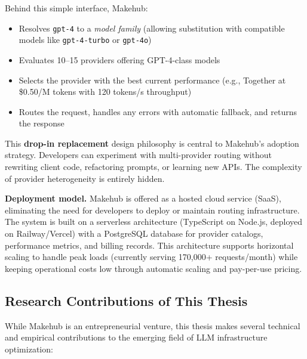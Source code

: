 \documentclass[english]{article}
\begin{document}
Behind this simple interface, Makehub:
\begin{itemize}
\item Resolves \texttt{gpt-4} to a \emph{model family} (allowing substitution with compatible models like \texttt{gpt-4-turbo} or \texttt{gpt-4o})
\item Evaluates 10--15 providers offering GPT-4-class models
\item Selects the provider with the best current performance (e.g., Together at \$0.50/M tokens with 120 tokens/s throughput)
\item Routes the request, handles any errors with automatic fallback, and returns the response
\end{itemize}

This \textbf{drop-in replacement} design philosophy is central to Makehub's adoption strategy. Developers can experiment with multi-provider routing without rewriting client code, refactoring prompts, or learning new APIs. The complexity of provider heterogeneity is entirely hidden.

\medskip

\noindent\textbf{Deployment model.}
Makehub is offered as a hosted cloud service (SaaS), eliminating the need for developers to deploy or maintain routing infrastructure.
The system is built on a serverless architecture (TypeScript on Node.js, deployed on Railway/Vercel) with a PostgreSQL database for provider catalogs, performance metrics, and billing records.
This architecture supports horizontal scaling to handle peak loads (currently serving 170,000+ requests/month) while keeping operational costs low through automatic scaling and pay-per-use pricing.

\subsection{Research Contributions of This Thesis}

While Makehub is an entrepreneurial venture, this thesis makes several technical and empirical contributions to the emerging field of LLM infrastructure optimization:
\end{document}
